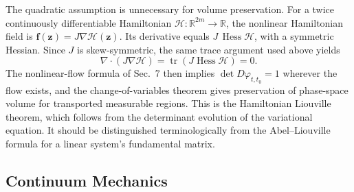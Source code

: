\documentclass[11pt,a4paper]{article}
\newcommand{\be}{\begin{equation}}
\newcommand{\ee}{\end{equation}}
\newcommand{\lb}[1]{\label{#1}}
\newcommand{\R}{\mathbb{R}}
\DeclareMathOperator{\tr}{tr}
\theoremstyle{definition}
\numberwithin{equation}{section}
\begin{document}
The quadratic assumption is unnecessary for volume preservation. For a twice continuously differentiable Hamiltonian $\mathcal H:\R^{2m}\to\R$, the nonlinear Hamiltonian field is $\mathbf f(\mathbf z)=J\nabla\mathcal H(\mathbf z)$. Its derivative equals $J\,\operatorname{Hess}\mathcal H$, with a symmetric Hessian. Since $J$ is skew-symmetric, the same trace argument used above yields
\be
\nabla\cdot\left(J\nabla\mathcal H\right)
=\tr\!\left(J\operatorname{Hess}\mathcal H\right)=0.
\lb{eq:ham-general-divergence}
\ee
The nonlinear-flow formula of Sec.~7 then implies $\det D\varphi_{t,t_0}=1$ wherever the flow exists, and the change-of-variables theorem gives preservation of phase-space volume for transported measurable regions. This is the Hamiltonian Liouville theorem, which follows from the determinant evolution of the variational equation. It should be distinguished terminologically from the Abel--Liouville formula for a linear system's fundamental matrix.

\subsection{Continuum Mechanics}
\end{document}
